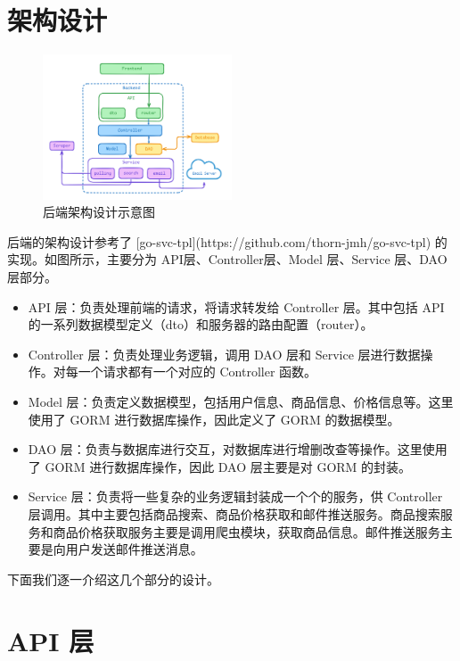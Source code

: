 \section{架构设计}

\begin{figure}[H]
\centering
\includegraphics[width=0.5\textwidth]{assets/report/backend_architecture.png}
\caption{后端架构设计示意图}
\end{figure}

后端的架构设计参考了 [go-svc-tpl](https://github.com/thorn-jmh/go-svc-tpl) 的实现。如图所示，主要分为 API层、Controller层、Model 层、Service 层、DAO 层部分。

\begin{itemize}
  \item API 层：负责处理前端的请求，将请求转发给 Controller 层。其中包括 API 的一系列数据模型定义（dto）和服务器的路由配置（router）。
  \item Controller 层：负责处理业务逻辑，调用 DAO 层和 Service 层进行数据操作。对每一个请求都有一个对应的 Controller 函数。
  \item Model 层：负责定义数据模型，包括用户信息、商品信息、价格信息等。这里使用了 GORM 进行数据库操作，因此定义了 GORM 的数据模型。
  \item DAO 层：负责与数据库进行交互，对数据库进行增删改查等操作。这里使用了 GORM 进行数据库操作，因此 DAO 层主要是对 GORM 的封装。
  \item Service 层：负责将一些复杂的业务逻辑封装成一个个的服务，供 Controller 层调用。其中主要包括商品搜索、商品价格获取和邮件推送服务。商品搜索服务和商品价格获取服务主要是调用爬虫模块，获取商品信息。邮件推送服务主要是向用户发送邮件推送消息。
\end{itemize}

下面我们逐一介绍这几个部分的设计。

\section{API 层}

